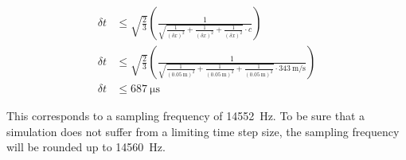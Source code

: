 
\begin{subequations}\label{fdtd_time_stepsize_con_one}
\begin{alignat}{2}
\delta t &\leq \sqrt{\frac{2}{3}}  \left( \frac{1}{\sqrt{\frac{1}{(\delta x)^2}+\frac{1}{(\delta x)^2}+\frac{1}{(\delta x)^2} }\cdot c} \right)\\
\delta t &\leq \sqrt{\frac{2}{3}}  \left( \frac{1}{\sqrt{\frac{1}{(\SI{0.05}{\meter})^2}+\frac{1}{(\SI{0.05}{\meter})^2}+\frac{1}{(\SI{0.05}{\meter})^2} }\cdot \SI{343}{\meter\per\second}} \right)\\
\delta t &\leq \SI{687}{\micro\second} 
\end{alignat}
\end{subequations}
    
This corresponds to a sampling frequency of \SI{14552}{\hertz}. To be sure that a simulation does not suffer from a limiting time step size, the sampling frequency will be rounded up to \SI{14560}{\hertz}.
 
 

%
%
%
%

